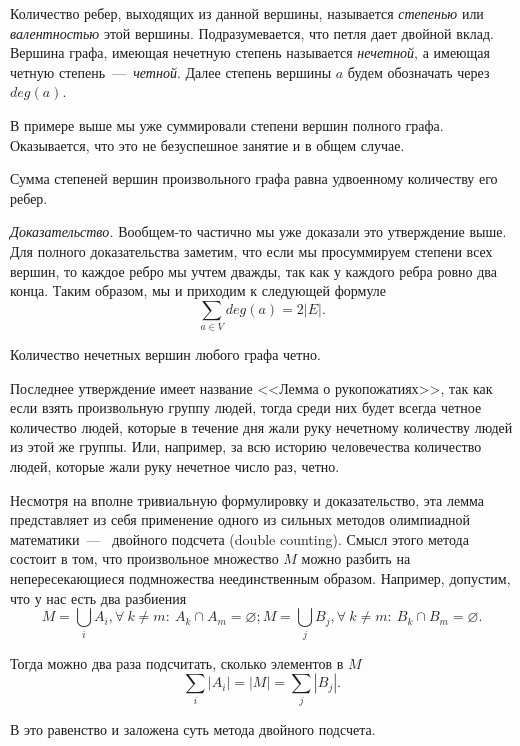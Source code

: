 \begin{definition}
	Количество ребер, выходящих из данной вершины, называется \emph{степенью} или \emph{валентностью} этой вершины. Подразумевается, что петля дает двойной вклад. Вершина графа, имеющая нечетную степень называется \emph{нечетной}, а имеющая четную степень~---~\emph{четной}. Далее степень вершины $a$ будем обозначать через $deg(a)$.
\end{definition}

	В примере выше мы уже суммировали степени вершин полного графа. Оказывается, что это не безуспешное занятие и в общем случае.

\begin{lemma}[о рукопожатиях]
	Сумма степеней вершин произвольного графа равна удвоенному количеству его ребер.
	
	\emph{Доказательство.} Вообщем-то частично мы уже доказали это утверждение выше. Для полного доказательства заметим, что если мы просуммируем степени всех вершин, то каждое ребро мы учтем дважды, так как у каждого ребра ровно два конца. Таким образом, мы и приходим к следующей формуле $$\sum_{a \in V} deg(a) = 2|E|.$$
\end{lemma}

\begin{consequence}
	Количество нечетных вершин любого графа четно.
\end{consequence}

	Последнее утверждение имеет название <<Лемма о рукопожатиях>>, так как если взять произвольную группу людей, тогда среди них будет всегда четное количество людей, которые в течение дня жали руку нечетному количеству людей из этой же группы. Или, например, за всю историю человечества количество людей, которые жали руку нечетное число раз, четно.

	Несмотря на вполне тривиальную формулировку и доказательство, эта лемма представляет из себя применение одного из сильных методов олимпиадной математики~---~ двойного подсчета (double counting). Смысл этого метода состоит в том, что произвольное множество $M$ можно разбить на непересекающиеся подмножества неединственным образом. Например, допустим, что у нас есть два разбиения 
$$M = \bigcup_i A_i, \forall \!\ k \neq m \colon \!\ A_k \cap A_m = \varnothing; M = \bigcup_j B_j,  \forall \!\ k \neq m \colon \!\ B_k \cap B_m = \varnothing.$$

	Тогда можно два раза подсчитать, сколько элементов в $M$
$$\sum_i |A_i| = |M| = \sum_j |B_j|.$$	
	
	В это равенство и заложена суть метода двойного подсчета.
	

